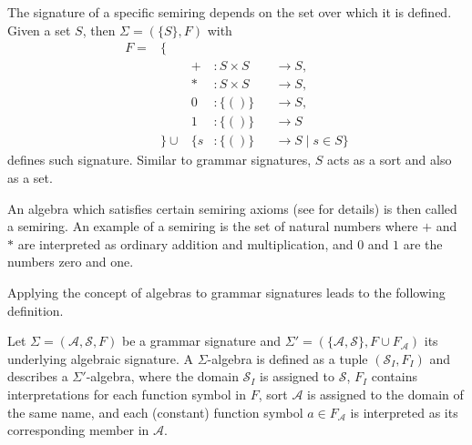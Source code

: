 \documentclass[
    a4paper,
    12pt,
    twoside,
    BCOR=12mm,
    parskip=half,
    chapterprefix,
    numbers=noenddot,
    bibliography=totoc
]{scrbook}
\begin{document}
\begin{example}
  \label{ex:semirings}
	The signature of a specific semiring depends on the set over which it is defined. Given a set $S$, then $\Sigma=(\{S\},F)$ with
	\begin{align*}
		F = &\{&&&&\\
		&&+ &: S \times S &&\to S,\\
    &&* &: S \times S &&\to S,\\    
		&&0 &: \{()\} &&\to S,\\
		&&1 &: \{()\} &&\to S\\
		&\} \mathrel{\cup} & \{ s &: \{()\} &&\to S \mid s \in S \}
	\end{align*}
	defines such signature. Similar to grammar signatures, $S$ acts as a sort and also as a set.
	
	An algebra which satisfies certain semiring axioms (see \citet{goodman_semiring_1999} for details) is then called a semiring. An example of a semiring is the set of natural numbers where $+$ and $*$ are interpreted as ordinary addition and multiplication, and $0$ and $1$ are the numbers zero and one.
\end{example}

Applying the concept of algebras to grammar signatures leads to the following definition.

\begin{definition}
	Let $\Sigma = (\mathcal{A},\mathcal{S},F)$ be a grammar signature and $\Sigma'=(\{\mathcal{A},\mathcal{S}\},F \cup F_\mathcal{A})$ its underlying algebraic signature.
	A $\Sigma$-algebra is defined as a tuple $(\mathcal{S}_I,F_I)$ and describes a $\Sigma'$-algebra, where the domain $\mathcal{S}_I$ is assigned to $\mathcal{S}$, $F_I$ contains interpretations for each function symbol in $F$, sort $\mathcal{A}$ is assigned to the domain of the same name, and each (constant) function symbol $a \in F_\mathcal{A}$ is interpreted as its corresponding member in $\mathcal{A}$.
\end{definition}
\end{document}
